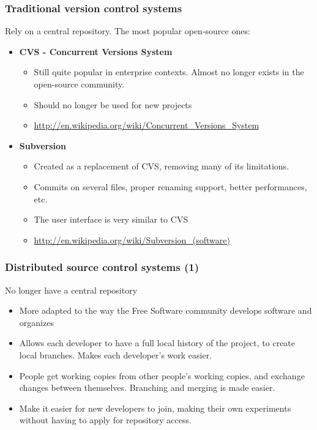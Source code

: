 \begin{frame}
  \frametitle{Traditional version control systems} Rely on a central
  repository. The most popular open-source ones:
  \begin{itemize}
  \item {\bf CVS - Concurrent Versions System}
    \begin{itemize}
    \item Still quite popular in enterprise contexts. Almost no longer
      exists in the open-source community.
    \item Should no longer be used for new projects
    \item
      \url{http://en.wikipedia.org/wiki/Concurrent_Versions_System}
    \end{itemize}
  \item {\bf Subversion}
    \begin{itemize}
    \item Created as a replacement of CVS, removing many of its
      limitations.
    \item Commits on several files, proper renaming support, better
      performances, etc.
    \item The user interface is very similar to CVS
    \item \url{http://en.wikipedia.org/wiki/Subversion_(software)}
    \end{itemize}
  \end{itemize}
\end{frame}

\begin{frame}
  \frametitle{Distributed source control systems (1)}
  No longer have a central repository
  \begin{itemize}
  \item More adapted to the way the Free Software community develops
    software and organizes
  \item Allows each developer to have a full local history of the
    project, to create local branches. Makes each developer's work
    easier.
  \item People get working copies from other people's working copies,
    and exchange changes between themselves. Branching and merging is
    made easier.
  \item Make it easier for new developers to join, making their own
    experiments without having to apply for repository access.
  \end{itemize}
\end{frame}

